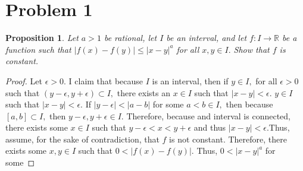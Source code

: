 \documentclass[openany, amssymb, psamsfonts]{amsart}
\newcommand{\bbR}{\mathbb{R}}
\newtheorem{prop}{Proposition}[section]
\theoremstyle{definition}
\numberwithin{equation}{section}
\begin{document}
\section*{Problem 1}
\begin{prop}
Let $a>1$ be rational, let $I$ be an interval, and let $f: I \to \bbR$ be a function such that $|f(x) - f(y)|\leq |x-y|^a$ for all $x,y \in I.$ Show that $f$ is constant. 
\end{prop}
\begin{proof}
    Let $\epsilon>0.$ I claim that because $I$ is an interval, then if $y\in I,$ for all $\epsilon>0$ such that $(y-\epsilon, y+ \epsilon)\subset I,$ there exists an $x\in I$ such that $|x-y|< \epsilon.$ $y\in I$ such that $|x-y|< \epsilon.$ \newline\newline If $|y-\epsilon|< |a-b|$ for some $a<b \in I,$ then because $[a,b]\subset I,$ then $y-\epsilon, y+ \epsilon \in I.$ Therefore, because and interval is connected, there exists some $x\in I$ such that $y- \epsilon< x < y + \epsilon$ and thus $|x-y|< \epsilon.$\newline\newline Thus, assume, for the sake of contradiction, that $f$ is not constant. Therefore, there exists some $x,y\in I$ such that $0< |f(x) - f(y)|.$ Thus, $0< |x-y|^a$ for some 
\end{proof}
\end{document}

